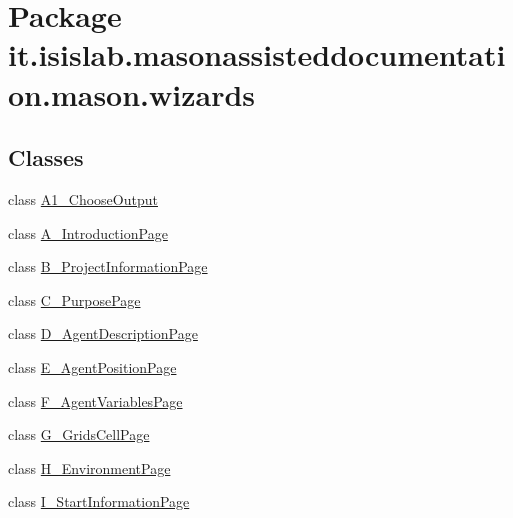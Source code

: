 \hypertarget{namespaceit_1_1isislab_1_1masonassisteddocumentation_1_1mason_1_1wizards}{\section{Package it.\-isislab.\-masonassisteddocumentation.\-mason.\-wizards}
\label{namespaceit_1_1isislab_1_1masonassisteddocumentation_1_1mason_1_1wizards}
}
\subsection*{Classes}
\begin{DoxyCompactItemize}
\item 
class \hyperlink{classit_1_1isislab_1_1masonassisteddocumentation_1_1mason_1_1wizards_1_1_a1___choose_output}{A1\-\_\-\-Choose\-Output}
\item 
class \hyperlink{classit_1_1isislab_1_1masonassisteddocumentation_1_1mason_1_1wizards_1_1_a___introduction_page}{A\-\_\-\-Introduction\-Page}
\item 
class \hyperlink{classit_1_1isislab_1_1masonassisteddocumentation_1_1mason_1_1wizards_1_1_b___project_information_page}{B\-\_\-\-Project\-Information\-Page}
\item 
class \hyperlink{classit_1_1isislab_1_1masonassisteddocumentation_1_1mason_1_1wizards_1_1_c___purpose_page}{C\-\_\-\-Purpose\-Page}
\item 
class \hyperlink{classit_1_1isislab_1_1masonassisteddocumentation_1_1mason_1_1wizards_1_1_d___agent_description_page}{D\-\_\-\-Agent\-Description\-Page}
\item 
class \hyperlink{classit_1_1isislab_1_1masonassisteddocumentation_1_1mason_1_1wizards_1_1_e___agent_position_page}{E\-\_\-\-Agent\-Position\-Page}
\item 
class \hyperlink{classit_1_1isislab_1_1masonassisteddocumentation_1_1mason_1_1wizards_1_1_f___agent_variables_page}{F\-\_\-\-Agent\-Variables\-Page}
\item 
class \hyperlink{classit_1_1isislab_1_1masonassisteddocumentation_1_1mason_1_1wizards_1_1_g___grids_cell_page}{G\-\_\-\-Grids\-Cell\-Page}
\item 
class \hyperlink{classit_1_1isislab_1_1masonassisteddocumentation_1_1mason_1_1wizards_1_1_h___environment_page}{H\-\_\-\-Environment\-Page}
\item 
class \hyperlink{classit_1_1isislab_1_1masonassisteddocumentation_1_1mason_1_1wizards_1_1_i___start_information_page}{I\-\_\-\-Start\-Information\-Page}

\end{DoxyCompactItemize}
